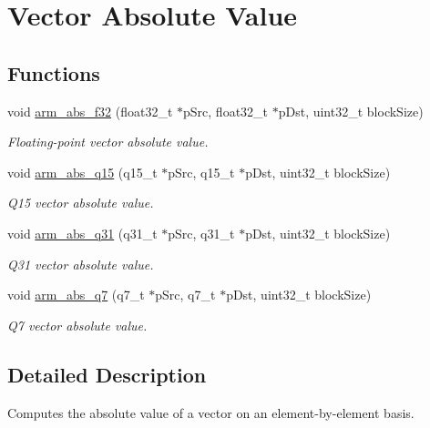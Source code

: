\hypertarget{group___basic_abs}{\section{Vector Absolute Value}
\label{group___basic_abs}
}
\subsection*{Functions}
\begin{DoxyCompactItemize}
\item 
void \hyperlink{group___basic_abs_ga421b6275f9d35f50286c0ff3beceff02}{arm\-\_\-abs\-\_\-f32} (float32\-\_\-t $\ast$p\-Src, float32\-\_\-t $\ast$p\-Dst, uint32\-\_\-t block\-Size)
\begin{DoxyCompactList}\small\item\em Floating-\/point vector absolute value. \end{DoxyCompactList}\item 
void \hyperlink{group___basic_abs_ga39f92964c9b649ba252e26ebe7b95594}{arm\-\_\-abs\-\_\-q15} (q15\-\_\-t $\ast$p\-Src, q15\-\_\-t $\ast$p\-Dst, uint32\-\_\-t block\-Size)
\begin{DoxyCompactList}\small\item\em Q15 vector absolute value. \end{DoxyCompactList}\item 
void \hyperlink{group___basic_abs_ga59eafcdcdb52da60d37f20aec6ff4577}{arm\-\_\-abs\-\_\-q31} (q31\-\_\-t $\ast$p\-Src, q31\-\_\-t $\ast$p\-Dst, uint32\-\_\-t block\-Size)
\begin{DoxyCompactList}\small\item\em Q31 vector absolute value. \end{DoxyCompactList}\item 
void \hyperlink{group___basic_abs_gadc30985e33fbf96802a5a7954dece3b1}{arm\-\_\-abs\-\_\-q7} (q7\-\_\-t $\ast$p\-Src, q7\-\_\-t $\ast$p\-Dst, uint32\-\_\-t block\-Size)
\begin{DoxyCompactList}\small\item\em Q7 vector absolute value. \end{DoxyCompactList}\end{DoxyCompactItemize}


\subsection{Detailed Description}
Computes the absolute value of a vector on an element-\/by-\/element basis.


